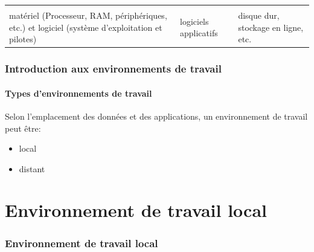 \documentclass{beamer}
\begin{document}
\begin{frame}
\begin{center}
\begin{tabular}{p{}p{}p{}}
	&&\\
	
	matériel (Processeur, RAM, périphériques, etc.) et logiciel (système d'exploitation et pilotes) &
	logiciels applicatifs & 
	disque dur, stockage en ligne, etc. \\
	\end{tabular}
\end{center}

\end{frame}

%
%

\begin{frame}
\frametitle{Introduction aux environnements de travail}
\framesubtitle{Types d'environnements de travail}

Selon l'emplacement des données et des applications, un environnement de travail peut être: 
\begin{itemize}
	\item local
	\item distant
\end{itemize}

\end{frame}

\section{Environnement de travail local}


\begin{frame}
\frametitle{Environnement de travail local}

\end{frame}
\end{document}
